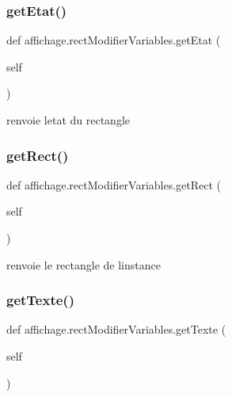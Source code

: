 \subsubsection{\texorpdfstring{get\+Etat()}{getEtat()}}
{\footnotesize\ttfamily def affichage.\+rect\+Modifier\+Variables.\+get\+Etat (\begin{DoxyParamCaption}\item[{}]{self }\end{DoxyParamCaption})}



renvoie l\textquotesingle{}etat du rectangle 

\mbox{\label{classaffichage_1_1rect_modifier_variables_a475182511e9c8824f4086dc4b7c8468c}} 
\subsubsection{\texorpdfstring{get\+Rect()}{getRect()}}
{\footnotesize\ttfamily def affichage.\+rect\+Modifier\+Variables.\+get\+Rect (\begin{DoxyParamCaption}\item[{}]{self }\end{DoxyParamCaption})}



renvoie le rectangle de l\textquotesingle{}instance 

\mbox{\label{classaffichage_1_1rect_modifier_variables_a7be1daba962628cf305415a2e4ec3312}} 
\subsubsection{\texorpdfstring{get\+Texte()}{getTexte()}}
{\footnotesize\ttfamily def affichage.\+rect\+Modifier\+Variables.\+get\+Texte (\begin{DoxyParamCaption}\item[{}]{self }\end{DoxyParamCaption})}



